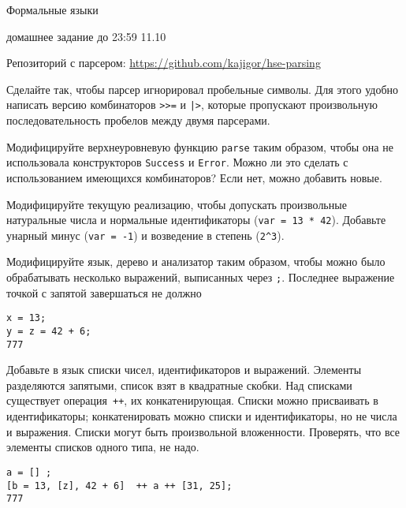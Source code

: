 \documentclass[12pt]{article}
\begin{document}
\begin{center} {\LARGE Формальные языки}

 {\Large домашнее задание до 23:59 11.10} \end{center} 
\bigskip

Репозиторий с парсером: \url{https://github.com/kajigor/hse-parsing}

\enumerate
{
  \item 
  {
    Сделайте так, чтобы парсер игнорировал пробельные символы. Для этого удобно написать версию комбинаторов \verb!>>=! и \verb!|>!, которые пропускают произвольную последовательность пробелов между двумя парсерами.
  }
  
  \item 
  {
    Модифицируйте верхнеуровневую функцию \verb!parse! таким образом, чтобы она не использовала конструкторов \verb!Success! и \verb!Error!. Можно ли это сделать с использованием имеющихся комбинаторов? Если нет, можно добавить новые.  
  }
  
  \item 
  {   
    Модифицируйте текущую реализацию, чтобы допускать произвольные натуральные числа и нормальные идентификаторы (\verb!var = 13 * 42!). Добавьте унарный минус (\verb!var = -1!) и возведение в степень (\verb!2^3!).
    
  }

  \item 
  {
    Модифицируйте язык, дерево и анализатор таким образом, чтобы можно было обрабатывать несколько выражений, выписанных через \verb!;!. Последнее выражение точкой с запятой завершаться не должно
    
    \begin{verbatim} 
x = 13; 
y = z = 42 + 6;
777
    \end{verbatim}
  }

  \item
  {
    Добавьте в язык списки чисел, идентификаторов и выражений. Элементы разделяются запятыми, список взят в квадратные скобки. Над списками существует операция~\verb!++!, их конкатенирующая. Списки можно присваивать в идентификаторы; конкатенировать можно списки и идентификаторы, но не числа и выражения. Списки могут быть произвольной вложенности. Проверять, что все элементы списков одного типа, не надо. 
    
    \begin{verbatim}
a = [] ; 
[b = 13, [z], 42 + 6]  ++ a ++ [31, 25];
777
    \end{verbatim}
  }
}
\end{document}

